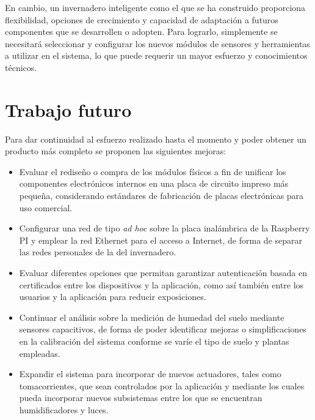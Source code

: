 En cambio, un invernadero inteligente como el que se ha construido proporciona flexibilidad, opciones de crecimiento y capacidad de adaptación a futuros componentes que se desarrollen o adopten. Para lograrlo, simplemente se necesitará seleccionar y configurar los nuevos módulos de sensores y herramientas a utilizar en el sistema, lo que puede requerir un mayor esfuerzo y conocimientos técnicos.






\section{Trabajo futuro}

Para dar continuidad al esfuerzo realizado hasta el momento y poder obtener un producto más completo se proponen
 las siguientes mejoras:

\begin{itemize}
\item Evaluar el rediseño o compra de los módulos físicos a fin de unificar los componentes electrónicos internos en una placa de circuito impreso más pequeña, considerando estándares de fabricación de placas electrónicas para uso comercial.

\item Configurar una red de tipo \textit{ad hoc} sobre la placa inalámbrica de la Raspberry PI y emplear la red Ethernet para el acceso a Internet, de forma de separar las redes personales de la del invernadero.

\item Evaluar diferentes opciones que permitan garantizar autenticación basada en certificados entre los dispositivos y la aplicación, como así también entre los usuarios y la aplicación para reducir exposiciones.

\item Continuar el análisis sobre la medición de humedad del suelo mediante sensores capacitivos, de forma de poder identificar mejoras o simplificaciones en la calibración del sistema conforme se varíe el tipo de suelo y plantas empleadas. 

\item Expandir el sistema para incorporar de nuevos actuadores, tales como tomacorrientes, que sean controlados por la aplicación y mediante los cuales pueda incorporar nuevos subsistemas entre los que se encuentran humidificadores y luces. 

\end{itemize}